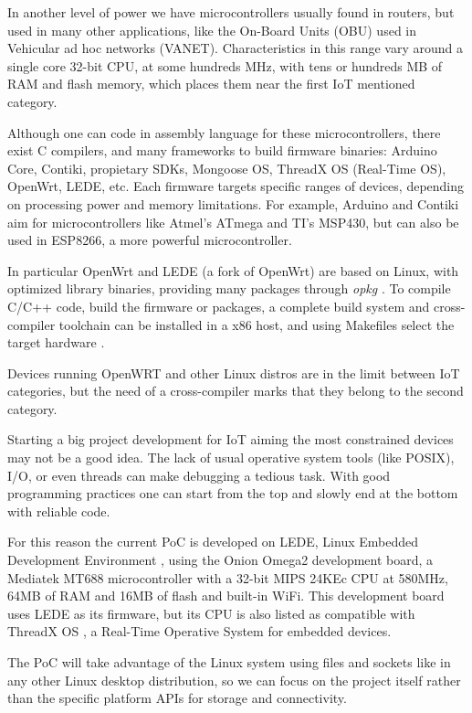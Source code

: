 In another level of power we have microcontrollers usually found in routers, but used in many other applications, like the On-Board Units (OBU) used in Vehicular ad hoc networks (VANET). Characteristics in this range vary around a single core 32-bit CPU, at some hundreds MHz, with tens or hundreds MB of RAM and flash memory, which places them near the first \ac{IoT} mentioned category. 

Although one can code in assembly language for these microcontrollers, there exist C compilers, and many frameworks to build firmware binaries: Arduino Core, Contiki, propietary SDKs, Mongoose OS, ThreadX OS (Real-Time OS), OpenWrt, LEDE, etc. Each firmware targets specific ranges of devices, depending on processing power and memory limitations. For example, Arduino and Contiki aim for microcontrollers like Atmel's ATmega and TI's MSP430, but can also be used in ESP8266, a more powerful microcontroller.

In particular OpenWrt and LEDE (a fork of OpenWrt) are based on Linux, with optimized library binaries, providing many packages through \textit{opkg} \citep{opkg}. To compile C/C++ code, build the firmware or packages, a complete build system and cross-compiler toolchain can be installed in a x86 host, and using Makefiles select the target hardware \citep{openwrtbuildsystem}.

Devices running OpenWRT and other Linux distros are in the limit between \ac{IoT} categories, but the need of a cross-compiler marks that they belong to the second category.

Starting a big project development for \ac{IoT} aiming the most constrained devices may not be a good idea. The lack of usual operative system tools (like POSIX), I/O, or even threads can make debugging a tedious task. With good programming practices one can start from the top and slowly end at the bottom with reliable code.

For this reason the current \ac{PoC} is developed on LEDE, Linux Embedded Development Environment \citep{ledeproject}, using the Onion Omega2 development board, a Mediatek MT688 microcontroller \citep{MT7688} with a 32-bit MIPS 24KEc CPU at 580MHz, 64MB of RAM and 16MB of flash and built-in WiFi. This development board uses LEDE as its firmware, but its CPU is also listed as compatible with ThreadX OS \citep{THREADX}, a Real-Time Operative System for embedded devices.

The \ac{PoC} will take advantage of the Linux system using files and sockets like in any other Linux desktop distribution, so we can focus on the project itself rather than the specific platform APIs for storage and connectivity.

